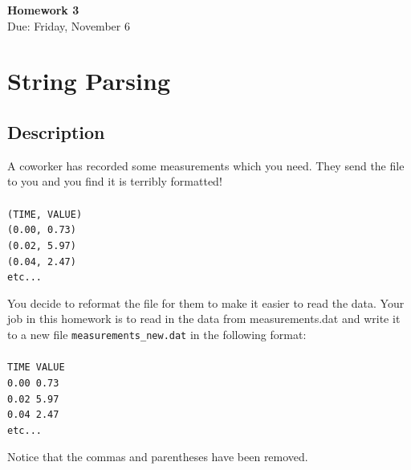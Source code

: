 \documentclass{article}
\begin{document}
\fancyfoot[C]{\thepage}
\vspace*{0cm}
\begin{center}
	{\LARGE \textbf{Homework 3}}\\
	\vspace{0.25cm}
	{\Large Due: Friday, November 6}
\end{center}

\newcommand{\filename}{measurements.dat}
\section*{String Parsing}
\subsection*{Description}
A coworker has recorded some measurements which you need. They send the file to you and you find it is terribly formatted!
\\\\\texttt{(TIME, VALUE)\\
(0.00, 0.73)\\
(0.02, 5.97)\\
(0.04, 2.47)\\
etc...}

You decide to reformat the file for them to make it easier to read the data. Your job in this homework is to read in the data from \filename{} and write it to a new file \texttt{measurements\_new.dat} in the following format:
\\\\\texttt{TIME VALUE\\
	0.00 0.73\\
	0.02 5.97\\
	0.04 2.47\\
	etc...}

Notice that the commas and parentheses have been removed.
\end{document}
